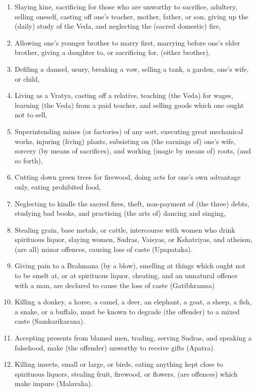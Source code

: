 \begin{enumerate}
\item Slaying kine, sacrificing for those who are unworthy to sacrifice, adultery, selling oneself, casting off one's teacher, mother, father, or son, giving up the (daily) study of the Veda, and neglecting the (sacred domestic) fire,
\item Allowing one's younger brother to marry first, marrying before one's elder brother, giving a daughter to, or sacrificing for, (either brother),
\item Defiling a damsel, usury, breaking a vow, selling a tank, a garden, one's wife, or child,
\item Living as a Vratya, casting off a relative, teaching (the Veda) for wages, learning (the Veda) from a paid teacher, and selling goods which one ought not to sell,
\item Superintending mines (or factories) of any sort, executing great mechanical works, injuring (living) plants, subsisting on (the earnings of) one's wife, sorcery (by means of sacrifices), and working (magic by means of) roots, (and so forth),
\item Cutting down green trees for firewood, doing acts for one's own advantage only, eating prohibited food,
\item Neglecting to kindle the sacred fires, theft, non-payment of (the three) debts, studying bad books, and practising (the arts of) dancing and singing,
\item Stealing grain, base metals, or cattle, intercourse with women who drink spirituous liquor, slaying women, Sudras, Vaisyas, or Kshatriyas, and atheism, (are all) minor offences, causing loss of caste (Upapataka).
\item Giving pain to a Brahmana (by a blow), smelling at things which ought not to be smelt at, or at spirituous liquor, cheating, and an unnatural offence with a man, are declared to cause the loss of caste (Gatibhramsa)
\item Killing a donkey, a horse, a camel, a deer, an elephant, a goat, a sheep, a fish, a snake, or a buffalo, must be known to degrade (the offender) to a mixed caste (Samkarikarana).
\item Accepting presents from blamed men, trading, serving Sudras, and speaking a falsehood, make (the offender) unworthy to receive gifts (Apatra).
\item Killing insects, small or large, or birds, eating anything kept close to spirituous liquors, stealing fruit, firewood, or flowers, (are offences) which make impure (Malavaha).

\end{enumerate}
